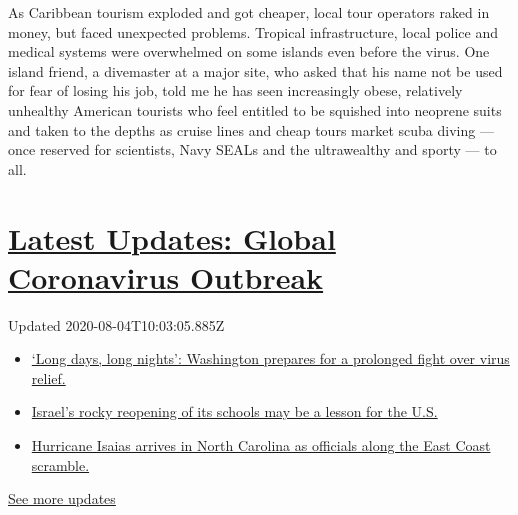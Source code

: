 As Caribbean tourism exploded and got cheaper, local tour operators
raked in money, but faced unexpected problems. Tropical infrastructure,
local police and medical systems were overwhelmed on some islands even
before the virus. One island friend, a divemaster at a major site, who
asked that his name not be used for fear of losing his job, told me he
has seen increasingly obese, relatively unhealthy American tourists who
feel entitled to be squished into neoprene suits and taken to the depths
as cruise lines and cheap tours market scuba diving --- once reserved
for scientists, Navy SEALs and the ultrawealthy and sporty --- to all.

\hypertarget{latest-updates-global-coronavirus-outbreak}{%
\section{\texorpdfstring{\href{https://www.nytimes3xbfgragh.onion/2020/08/04/world/coronavirus-covid-19.html?action=click\&pgtype=Article\&state=default\&region=MAIN_CONTENT_1\&context=storylines_live_updates}{Latest
Updates: Global Coronavirus
Outbreak}}{Latest Updates: Global Coronavirus Outbreak}}\label{latest-updates-global-coronavirus-outbreak}}

Updated 2020-08-04T10:03:05.885Z

\begin{itemize}
\tightlist
\item
  \href{https://www.nytimes3xbfgragh.onion/2020/08/04/world/coronavirus-covid-19.html?action=click\&pgtype=Article\&state=default\&region=MAIN_CONTENT_1\&context=storylines_live_updates\#link-6b644638}{`Long
  days, long nights': Washington prepares for a prolonged fight over
  virus relief.}
\item
  \href{https://www.nytimes3xbfgragh.onion/2020/08/04/world/coronavirus-covid-19.html?action=click\&pgtype=Article\&state=default\&region=MAIN_CONTENT_1\&context=storylines_live_updates\#link-7af9fca0}{Israel's
  rocky reopening of its schools may be a lesson for the U.S.}
\item
  \href{https://www.nytimes3xbfgragh.onion/2020/08/04/world/coronavirus-covid-19.html?action=click\&pgtype=Article\&state=default\&region=MAIN_CONTENT_1\&context=storylines_live_updates\#link-33bf9168}{Hurricane
  Isaias arrives in North Carolina as officials along the East Coast
  scramble.}
\end{itemize}

\href{https://www.nytimes3xbfgragh.onion/2020/08/04/world/coronavirus-covid-19.html?action=click\&pgtype=Article\&state=default\&region=MAIN_CONTENT_1\&context=storylines_live_updates}{See
more updates}

